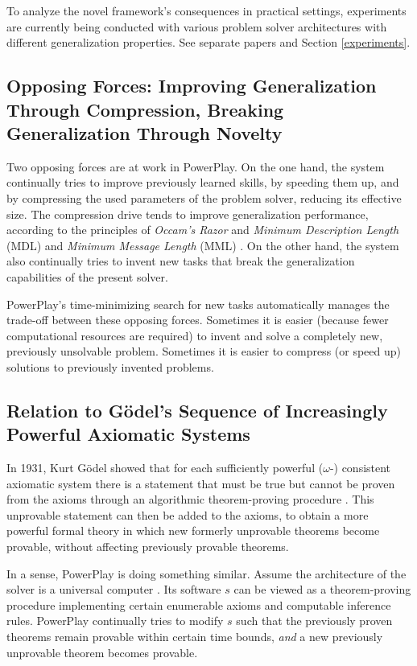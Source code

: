 \documentclass{article}
\begin{document}
To analyze the novel framework's consequences 
in practical settings,  experiments are currently  being conducted with various
problem solver architectures with different generalization properties.
See separate papers \cite{rupesh2012icdl,powerplay2012experiments} and
Section \ref{experiments}.

\subsection{Opposing Forces: Improving Generalization Through Compression, Breaking Generalization Through Novelty}
\label{opposing}
Two opposing forces are at work in  {\sc PowerPlay}. On the one hand, the system continually tries to improve 
previously learned skills, by speeding them up, and by compressing the used parameters of the problem solver, reducing its effective size. 
The compression drive tends to improve generalization performance, according to  the principles of  {\em Occam's Razor}
and \emph{Minimum Description Length} (MDL) and  \emph{Minimum Message Length} (MML)
\cite{Solomonoff:64,Kolmogorov:65,Wallace:68,Wallace:87,Solomonoff:78,Rissanen:78,LiVitanyi:97,Hutter:05book+}.
On the other hand, the system also continually tries to invent new tasks that break the generalization capabilities of the present solver.

{\sc PowerPlay}'s time-minimizing search for new tasks automatically manages the trade-off between these opposing forces. 
Sometimes it is easier (because fewer computational resources are required) to invent and solve a completely new, previously unsolvable problem.
Sometimes  it is easier to compress (or speed up) solutions to previously invented problems.


\subsection{Relation to G\"{o}del's Sequence of Increasingly Powerful Axiomatic Systems}
\label{goedel}

In 1931, Kurt G\"{o}del showed that for each sufficiently powerful ($\omega$-) consistent axiomatic system 
there is a statement that must be true but cannot be proven from the axioms through an algorithmic theorem-proving procedure \cite{Goedel:31}.
This unprovable statement can then be added to the axioms, to obtain a more powerful formal theory in which 
new formerly unprovable theorems become provable, without affecting previously provable theorems.

In a sense,  {\sc PowerPlay} is doing something similar. 
Assume the architecture of the solver is a universal computer \cite{Goedel:31,Turing:36}. Its software $s$ can be viewed as a theorem-proving procedure
implementing certain enumerable axioms and computable inference rules. {\sc PowerPlay} continually tries to modify $s$ such that the  previously proven
theorems remain provable within certain time bounds, {\em and} a new previously unprovable theorem becomes provable.
\end{document}
